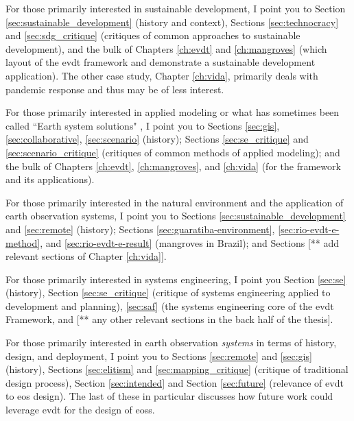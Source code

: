 For those primarily interested in sustainable development, I point you to Section \ref{sec:sustainable_development} (history and context), Sections \ref{sec:technocracy} and \ref{sec:sdg_critique} (critiques of common approaches to sustainable development), and the bulk of Chapters \ref{ch:evdt} and \ref{ch:mangroves} (which layout of the \ac{evdt} framework and demonstrate a sustainable development application). The other case study, Chapter \ref{ch:vida}, primarily deals with pandemic response and thus may be of less interest.

For those primarily interested in applied modeling or what has sometimes been called ``Earth system solutions" \cite{jonesGainingSeatPolicy2002}, I point you to Sections \ref{sec:gis}, \ref{sec:collaborative}, \ref{sec:scenario} (history); Sections \ref{sec:se_critique} and \ref{sec:scenario_critique} (critiques of common methods of applied modeling); and the bulk of Chapters \ref{ch:evdt}, \ref{ch:mangroves}, and \ref{ch:vida} (for the framework and its applications).

For those primarily interested in the natural environment and the application of earth observation systems, I point you to Sections \ref{sec:sustainable_development} and \ref{sec:remote} (history); Sections \ref{sec:guaratiba-environment}, \ref{sec:rio-evdt-e-method}, and \ref{sec:rio-evdt-e-result} (mangroves in Brazil); and Sections [** add relevant sections of Chapter \ref{ch:vida}].

For those primarily interested in systems engineering, I point you Section \ref{sec:se} (history), Section \ref{sec:se_critique} (critique of systems engineering applied to development and planning), \ref{sec:saf} (the systems engineering core of the \ac{evdt} Framework, and [** any other relevant sections in the back half of the thesis].

For those primarily interested in earth observation \textit{systems} in terms of history, design, and deployment, I point you to Sections \ref{sec:remote} and \ref{sec:gis} (history), Sections \ref{sec:elitism} and \ref{sec:mapping_critique} (critique of traditional design process), Section \ref{sec:intended} and Section \ref{sec:future} (relevance of \ac{evdt} to \ac{eos} design). The last of these in particular discusses how future work could leverage \ac{evdt} for the design of \acp{eos}.